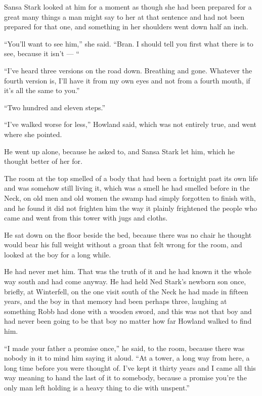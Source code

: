 Sansa Stark looked at him for a moment as though she had been prepared for a great many things a man might say to her at that sentence and had not been prepared for that one, and something in her shoulders went down half an inch.

“You’ll want to see him,” she said. “Bran. I should tell you first what there is to see, because it isn’t — “

“I’ve heard three versions on the road down. Breathing and gone. Whatever the fourth version is, I’ll have it from my own eyes and not from a fourth mouth, if it’s all the same to you.”

“Two hundred and eleven steps.”

“I’ve walked worse for less,” Howland said, which was not entirely true, and went where she pointed.

\sceneBreak

He went up alone, because he asked to, and Sansa Stark let him, which he thought better of her for.

The room at the top smelled of a body that had been a fortnight past its own life and was somehow still living it, which was a smell he had smelled before in the Neck, on old men and old women the swamp had simply forgotten to finish with, and he found it did not frighten him the way it plainly frightened the people who came and went from this tower with jugs and cloths.

He sat down on the floor beside the bed, because there was no chair he thought would bear his full weight without a groan that felt wrong for the room, and looked at the boy for a long while.

He had never met him. That was the truth of it and he had known it the whole way south and had come anyway. He had held Ned Stark’s newborn son once, briefly, at Winterfell, on the one visit south of the Neck he had made in fifteen years, and the boy in that memory had been perhaps three, laughing at something Robb had done with a wooden sword, and this was not that boy and had never been going to be that boy no matter how far Howland walked to find him.

“I made your father a promise once,” he said, to the room, because there was nobody in it to mind him saying it aloud. “At a tower, a long way from here, a long time before you were thought of. I’ve kept it thirty years and I came all this way meaning to hand the last of it to somebody, because a promise you’re the only man left holding is a heavy thing to die with unspent.”

